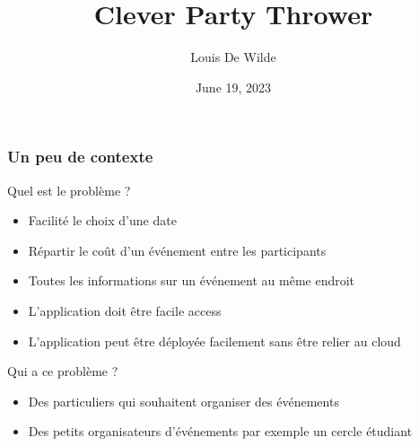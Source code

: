 \documentclass[aspectratio=169]{beamer}
\title{Clever Party Thrower}
\author{Louis De Wilde}
\date{June 19, 2023}
\begin{document}
    \frame{\titlepage}
    \begin{frame}
        \frametitle{Un peu de contexte}
        Quel est le problème ?
        \begin{itemize}
            \item Facilité le choix d'une date
            \item Répartir le coût d'un événement entre les participants
            \item Toutes les informations sur un événement au même endroit
            \item L'application doit être facile access
            \item L'application peut être déployée facilement sans être relier au cloud
        \end{itemize}
        Qui a ce problème ?
        \begin{itemize}
            \item Des particuliers qui souhaitent organiser des événements
            \item Des petits organisateurs d'événements par exemple un cercle étudiant
        \end{itemize}
    \end{frame}
\end{document}

